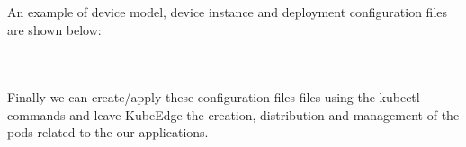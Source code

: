 An example of device model, device instance and deployment configuration files are shown below:

\inputminted[frame=single,
framesep=2mm,
baselinestretch=1.2,
fontsize=\footnotesize,
linenos,
breaklines]{yaml}{sourcecode/led-light-device-model.yaml}


\inputminted[frame=single,
framesep=2mm,
baselinestretch=1.2,
fontsize=\footnotesize,
linenos,
breaklines]{yaml}{sourcecode/led-light-device-instance.yaml}


\inputminted[frame=single,
framesep=2mm,
baselinestretch=1.2,
fontsize=\footnotesize,
linenos,
breaklines]{yaml}{sourcecode/deployment.yaml}


Finally we can create/apply these configuration files files using the kubectl commands and leave KubeEdge the creation, distribution and management of the pods related to the our applications.




\clearpage
\thispagestyle{empty}



















